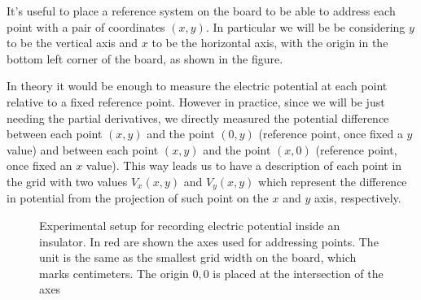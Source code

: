 \documentclass[notitlepage]{report}
\newcounter{theo}[section]\setcounter{theo}{0}
\numberwithin{equation}{section}
\theoremstyle{plain}
\theoremstyle{definition}
\theoremstyle{remark}
\begin{document}
It's useful to place a reference system on the board to be able to address each
point with a pair of coordinates \((x, y)\). In particular we will be be
considering \(y\) to be the vertical axis and \(x\) to be the horizontal axis,
with the origin in the bottom left corner of the board, as shown in the figure.

In theory it would be enough to measure the electric potential at each point
relative to a fixed reference point. However in practice, since we will be just
needing the partial derivatives, we directly measured the potential difference
between each point \((x, y)\) and the point \((0, y)\) (reference point, once
fixed a \(y\) value) and between each point \((x, y)\) and the point \((x, 0)\)
(reference point, once fixed an \(x\) value). This way leads us to have a
description of each point in the grid with two values \(V_x(x, y)\) and \(V_y(x,
y)\) which represent the difference in potential from the projection of such
point on the \(x\) and \(y\) axis, respectively.

\begin{figure}[h!t]
    \caption{Experimental setup for recording electric potential inside an
        insulator. In red are shown the axes used for addressing points.
The unit is the same as the smallest grid width on the
board, which marks centimeters. The origin \(0,0\) is placed at the intersection
of the axes }\label{fig:setup-visualize}
\end{figure}
\end{document}

